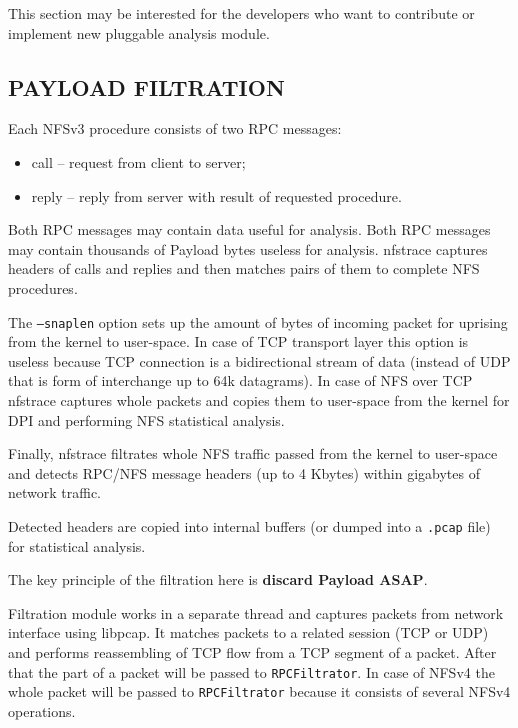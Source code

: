 \documentclass[oneside]{article}
\newcommand{\code}[1]{\texttt{#1}}
\newcommand{\gls}{}
\newcommand*{\textfile}[1]{\textsf{#1}}
\newcommand*{\textprog}[1]{\textfile{#1}}
\begin{document}
This section may be interested for the developers who want to contribute or
implement new pluggable analysis module.

\subsection{PAYLOAD FILTRATION}

Each NFSv3 procedure consists of two RPC messages:

\begin{itemize}
    \item call – request from client to server;
    \item reply – reply from server with result of requested procedure.
\end{itemize}
\vspace{5mm}

Both RPC messages may contain data useful for analysis. Both RPC messages may
contain thousands of \gls{Payload} bytes useless for analysis. nfstrace
captures headers of calls and replies and then matches pairs of them to
complete \gls{NFS} procedures.

The \code{--snaplen} option sets up the amount of bytes of incoming packet for
uprising from the kernel to user-space. In case of TCP transport layer this
option is useless because TCP connection is a bidirectional stream of data
(instead of UDP that is form of interchange up to 64k datagrams). In case of
\gls{NFS} over TCP \textprog{nfstrace} captures whole packets and copies them to
user-space from the kernel for \gls{DPI} and performing \gls{NFS} statistical
analysis.

Finally, \textprog{nfstrace} filtrates whole \gls{NFS} traffic passed from the kernel to
user-space and detects RPC/NFS message headers (up to 4 Kbytes) within
gigabytes of network traffic.

Detected headers are copied into internal buffers (or dumped into a
\code{.pcap} file) for statistical analysis.

The key principle of the filtration here is \textbf{discard \gls{Payload}
ASAP}.

Filtration module works in a separate thread and captures packets from network
interface using libpcap. It matches packets to a related session (TCP or UDP)
and performs reassembling of TCP flow from a TCP segment of a packet. After
that the part of a packet will be passed to \code{RPCFiltrator}. In case of NFSv4 the
whole packet will be passed to \code{RPCFiltrator} because it consists of several
NFSv4 operations.  
\end{document}
